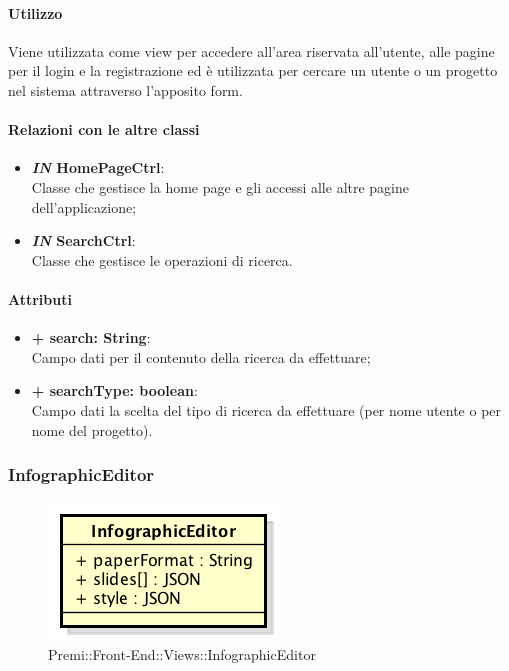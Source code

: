 	\paragraph{Utilizzo}
	Viene utilizzata come view per accedere all'area riservata all'utente, alle pagine per il login e la registrazione ed è utilizzata per cercare un utente o un progetto nel sistema attraverso l'apposito form.
	
	\paragraph{Relazioni con le altre classi}
	\begin{itemize}
		\item \textbf{\textit{IN} HomePageCtrl}:\\
			Classe che gestisce la home page e gli accessi alle altre pagine dell'applicazione;
		\item \textbf{\textit{IN} SearchCtrl}:\\
			Classe che gestisce le operazioni di ricerca.
	\end{itemize}
	
	\paragraph{Attributi}
	\begin{itemize}
		\item \textbf{+ search: String}:\\
			Campo dati per il contenuto della ricerca da effettuare;
		\item \textbf{+ searchType: boolean}:\\
			Campo dati la scelta del tipo di ricerca da effettuare (per nome utente o per nome del progetto).
	\end{itemize}
	
	
\subsubsection{InfographicEditor}
	\begin{figure}[h]
		\centering
		\includegraphics[width=0.3\linewidth]{img/premi_front_end_views_infographiceditor}
		\caption[Premi::Front-End::Views::InfographicEditor]{Premi::Front-End::Views::InfographicEditor}
	\end{figure}
	
